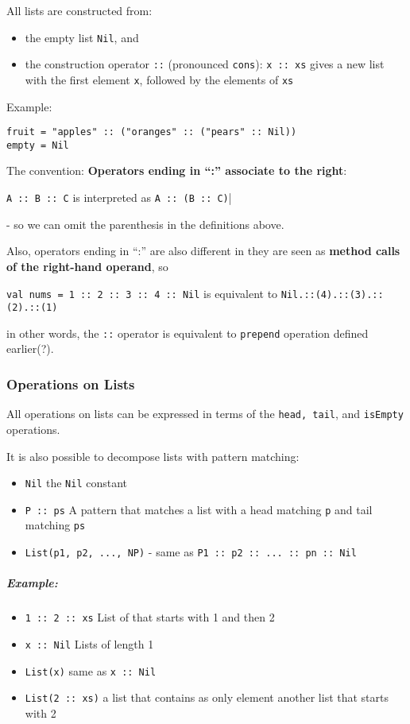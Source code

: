 \documentclass{scrartcl}
\newcommand{\example}{\subparagraph{Example:}} %
\newcommand{\term}[1]{\verb~#1~} %
\begin{document}
All lists are constructed from:
\begin{itemize}
\item the empty list \lstinline|Nil|, and
\item the construction operator \lstinline|::| (pronounced \term{cons}):
  \lstinline|x :: xs| gives a new list with the first element \lstinline|x|,
  followed by the elements of \lstinline|xs|
\end{itemize}
Example:
\begin{lstlisting}
fruit = "apples" :: ("oranges" :: ("pears" :: Nil))
empty = Nil
\end{lstlisting}
The convention: {\bf Operators ending in ``:'' associate to the right}:

\lstinline|A :: B :: C| is interpreted as \lstinline|A :: (B :: C)||

- so we can omit the parenthesis in the definitions above.

Also, operators ending in ``:'' are also different in they are seen as {\bf
  method calls of the right-hand operand}, so

\lstinline|val nums = 1 :: 2 :: 3 :: 4 :: Nil| is equivalent to
\lstinline|Nil.::(4).::(3).::(2).::(1)|

in other words, the \lstinline|::| operator is equivalent to \lstinline|prepend|
operation defined earlier(?).

\subsubsection{Operations on Lists}
\label{sec:OprationsOnLists}

All operations on lists can be expressed in terms of the \lstinline|head, tail|,
and \lstinline|isEmpty| operations.

It is also possible to decompose lists with pattern matching:
\begin{itemize}
\item \lstinline|Nil| the \lstinline|Nil| constant
\item \lstinline|P :: ps| A pattern that matches a list with a head matching
  \lstinline|p| and tail matching \lstinline|ps|
\item \lstinline|List(p1, p2, ..., NP)| - same as
  \lstinline|P1 :: p2 :: ... :: pn :: Nil|
\end{itemize}
\example
\begin{itemize}
\item \lstinline|1 :: 2 :: xs| List of that starts with 1 and then 2
\item \lstinline|x :: Nil| Lists of length 1
\item \lstinline|List(x)| same as \lstinline|x :: Nil|
\item \lstinline|List(2 :: xs)| a list that contains as only element another
  list that starts with 2
\end{itemize}
\end{document}
